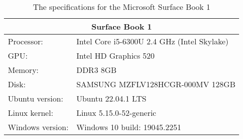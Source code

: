 \begin{table}[H]
    \centering
    \begin{tabular}{ll}
    \hline
    \multicolumn{2}{|c|}{Surface Book 1}           \\ \hline
    Processor:      & Intel Core i5-6300U 2.4 GHz (Intel Skylake)      \\
    GPU:            & Intel HD Graphics 520          \\
    Memory:         & DDR3 8GB                         \\
    Disk:           & SAMSUNG MZFLV128HCGR-000MV 128GB \\
    Ubuntu version:  & Ubuntu 22.04.1 LTS                \\
    Linux kernel: & Linux 5.15.0-52-generic       \\
    Windows version:& Windows 10 build: 19045.2251
    \end{tabular}
    \caption{The specifications for the Microsoft Surface Book 1}
    \label{tab:surfaceBook}
\end{table} 